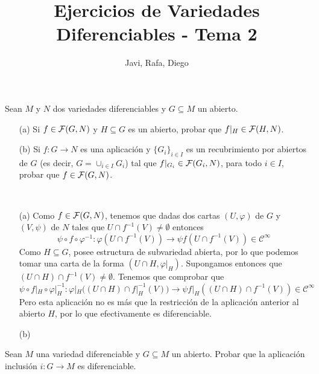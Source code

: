 \documentclass[twoside]{article}
\begin{document}
\title{Ejercicios de Variedades Diferenciables - Tema 2}
\author{Javi, Rafa, Diego}
\maketitle



\begin{ejercicio}{1}\label{1}
Sean $M$ y $N$ dos variedades diferenciables y $G \subseteq M$ un abierto.
\begin{itemize}
\item[(a)] Si $f \in \mathcal{F}(G,N)$ y $H \subseteq G$ es un abierto, probar que $f|_H \in \mathcal{F}(H,N)$.
\item[(b)] Si $f: G \to N$ es una aplicación y $\{G_i\}_{i\in I}$ es un recubrimiento por
abiertos de $G$ (es decir, $G = \cup_{i\in I} G_i$) tal que $f|_{G_i} \in \mathcal{F}(G_i,N)$, para
todo $i \in I$, probar que $f \in \mathcal{F}(G,N)$.
\end{itemize}
\end{ejercicio}
\begin{solucion}\
\begin{itemize}
\item[(a)]Como $f\in\mathcal{F}(G,N)$, tenemos que dadas dos cartas $(U,\varphi)$ de $G$ y $(V,\psi)$ de $N$ tales que $U\cap f^{-1}(V)\neq\emptyset$ entonces
$$\psi\circ f\circ\varphi^{-1}:\varphi(U\cap f^{-1}(V))\to\psi f(U\cap f^{-1}(V))\in\mathcal{C}^\infty$$ 
Como $H\subseteq G$, posee estructura de subvariedad abierta, por lo que podemos tomar una carta de la forma $(U\cap H,\varphi|_H)$. Supongamos entonces que $(U\cap H)\cap f^{-1}(V)\neq\emptyset$. Tenemos que comprobar que 
$$\psi\circ f|_H\circ\varphi|_H^{-1}:\varphi|_H((U\cap H)\cap f|_H^{-1}(V))\to\psi f|_H((U\cap H)\cap f^{-1}(V))\in\mathcal{C}^\infty$$ 
Pero esta aplicación no es más que la restricción de la aplicación anterior al abierto $H$, por lo que efectivamente es diferenciable.
\item[(b)]
\end{itemize}
\end{solucion}

\newpage

\begin{ejercicio}{2}
Sean $M$ una variedad diferenciable y $G \subseteq M$ un abierto. Probar que la
aplicación inclusión $i : G \to M$ es diferenciable.
\end{ejercicio}
\begin{solucion}

\end{solucion}
\end{document}
